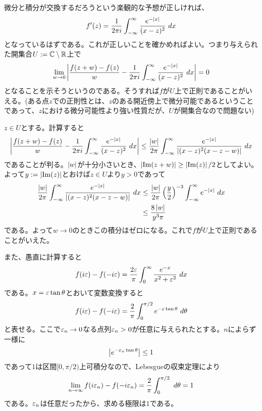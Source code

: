 \subsubsection{}%
\begin{sol}
微分と積分が交換するだろうという楽観的な予想が正しければ、
\[
f'(z) = \frac{1}{2 \pi i} \int_{- \infty}^{\infty} \frac{ e^{- \left \lvert x \right \rvert }  }{ (x - z )^2} \ dx
\]
となっているはずである。これが正しいことを確かめればよい。つまり与えられた開集合$U := {\mathbb C} \setminus {\mathbb R}$上で
\[
\lim_{w \to 0} \left \lvert  \frac{ f(z + w)-f(z) }{w} - \frac{1}{2 \pi i} \int_{- \infty}^{\infty} \frac{ e^{- \left \lvert x \right \rvert }  }{ (x - z )^2} \ dx  \right \rvert = 0
\]
となることを示そうというのである。そうすれば$f$が$U$上で正則であることがいえる。(ある点$z$での正則性とは、$z$のある開近傍上で微分可能であるということであって、$z$における微分可能性より強い性質だが、$U$が開集合なので問題ない)

$z \in U$とする。計算すると
\[
\left \lvert  \frac{ f(z + w)-f(z) }{w} - \frac{1}{2 \pi i} \int_{- \infty}^{\infty} \frac{ e^{- \left \lvert x \right \rvert }  }{ (x - z )^2} \ dx  \right \rvert \leq \frac{\left \lvert w \right \rvert }{2 \pi} \int_{- \infty}^{\infty} \frac{ e^{- \left \lvert x \right \rvert }  }{ \left \lvert (x - z )^2 (x-z-w)  \right \rvert  } \ dx
\]
であることが判る。$\left \lvert w \right \rvert$が十分小さいとき、$\left \lvert  \operatorname{Im}(z+w) \right \rvert \geq \left \lvert  \operatorname{Im}(z) \right \rvert  /2$としてよい。よって$y := \left \lvert  \operatorname{Im}(z) \right \rvert$とおけば$z \in U$より$y > 0$であって
\begin{align*}
  \frac{\left \lvert w \right \rvert }{2 \pi} \int_{- \infty}^{\infty} \frac{ e^{- \left \lvert x \right \rvert }  }{ \left \lvert (x - z )^2 (x-z-w)  \right \rvert  } \ dx &\leq    \frac{\left \lvert w \right \rvert }{2 \pi}  \left( \frac{y}{2} \right)^{-3}  \int_{- \infty}^{\infty} e^{- \left \lvert x \right \rvert }  \ dx \\
  &\leq \frac{ 8 \left \lvert w \right \rvert }{ y^3 \pi }
\end{align*}
である。よって$w \to 0$のときこの積分はゼロになる。これで$f$が$U$上で正則であることがいえた。

また、愚直に計算すると
\[
f(i \ve) - f(- i \ve) = \f{ 2\ve }{ \pi } \int_0^{\infty} \f{e^{-x}}{x^2 + \ve^2} \ dx
\]
である。$x = {\varepsilon} \tan {\theta}$とおいて変数変換すると
\[
f(i \ve) - f(- i \ve) = \f{ 2 }{ \pi } \int_0^{\pi /2} e^{ - \ve \tan \grt} \ d\grt
\]
と表せる。ここで${\varepsilon}_n \to 0$なる点列${\varepsilon}_n > 0$が任意に与えられたとする。$n$によらず一様に
\[
\left \lvert  e^{ - {\varepsilon}_n \tan {\theta}}  \right \rvert \leq 1
\]
であって$1$は区間$[0, \pi/2)$上可積分なので、Lebesgueの収束定理により
\[
\lim_{n \to \infty} f(i {\varepsilon}_n) - f(- i {\varepsilon}_n) = \frac{ 2 }{ \pi } \int_0^{\pi /2}  \ d{\theta} = 1
\]
である。${\varepsilon}_n$は任意だったから、求める極限は$1$である。
\end{sol}
